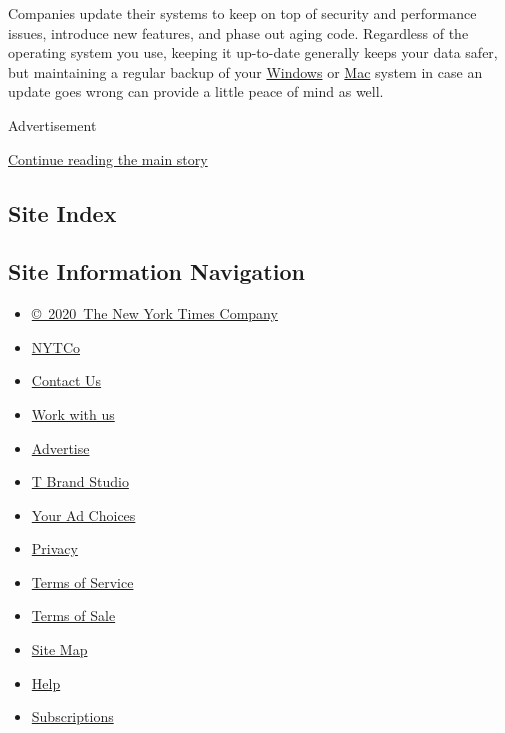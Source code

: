 Companies update their systems to keep on top of security and
performance issues, introduce new features, and phase out aging code.
Regardless of the operating system you use, keeping it up-to-date
generally keeps your data safer, but maintaining a regular backup of
your
\href{https://support.microsoft.com/en-us/help/17143/windows-10-back-up-your-files}{Windows}
or \href{https://support.apple.com/en-us/HT201250}{Mac} system in case
an update goes wrong can provide a little peace of mind as well.

Advertisement

\protect\hyperlink{after-bottom}{Continue reading the main story}

\hypertarget{site-index}{%
\subsection{Site Index}\label{site-index}}

\hypertarget{site-information-navigation}{%
\subsection{Site Information
Navigation}\label{site-information-navigation}}

\begin{itemize}
\tightlist
\item
  \href{https://help.nytimes.com/hc/en-us/articles/115014792127-Copyright-notice}{©~2020~The
  New York Times Company}
\end{itemize}

\begin{itemize}
\tightlist
\item
  \href{https://www.nytco.com/}{NYTCo}
\item
  \href{https://help.nytimes.com/hc/en-us/articles/115015385887-Contact-Us}{Contact
  Us}
\item
  \href{https://www.nytco.com/careers/}{Work with us}
\item
  \href{https://nytmediakit.com/}{Advertise}
\item
  \href{http://www.tbrandstudio.com/}{T Brand Studio}
\item
  \href{https://www.nytimes.com/privacy/cookie-policy\#how-do-i-manage-trackers}{Your
  Ad Choices}
\item
  \href{https://www.nytimes.com/privacy}{Privacy}
\item
  \href{https://help.nytimes.com/hc/en-us/articles/115014893428-Terms-of-service}{Terms
  of Service}
\item
  \href{https://help.nytimes.com/hc/en-us/articles/115014893968-Terms-of-sale}{Terms
  of Sale}
\item
  \href{https://spiderbites.nytimes.com}{Site Map}
\item
  \href{https://help.nytimes.com/hc/en-us}{Help}
\item
  \href{https://www.nytimes.com/subscription?campaignId=37WXW}{Subscriptions}
\end{itemize}
